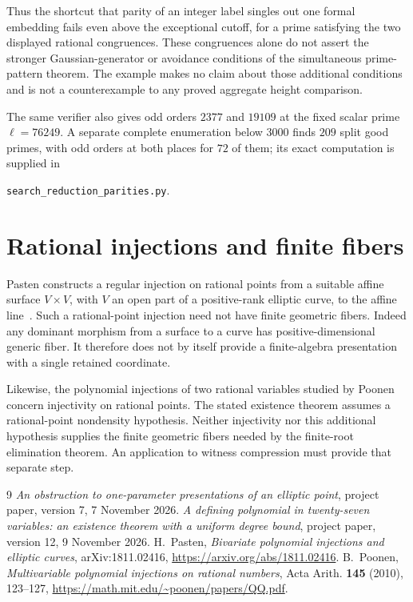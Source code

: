\documentclass[11pt,a4paper]{article}
\theoremstyle{remark}\newtheorem{remark}[theorem]{Remark}
\begin{document}
Thus the shortcut that parity of an integer label singles out one
formal embedding fails even above the exceptional cutoff, for a
prime satisfying the two displayed rational congruences.  These
congruences alone do not assert the stronger Gaussian-generator
or avoidance conditions of the simultaneous prime-pattern theorem.
The example makes no claim about those additional conditions and
is not a counterexample to any proved aggregate height comparison.

The same verifier also gives odd orders $2377$ and $19109$ at the
fixed scalar prime $\ell=76249$.  A separate complete enumeration
below $3000$ finds $209$ split good primes, with odd orders at both
places for $72$ of them; its exact computation is supplied in
\begin{center}\small
\nolinkurl{search_reduction_parities.py}.
\end{center}

\section{Rational injections and finite fibers}

Pasten constructs a regular injection on rational points from
a suitable affine surface $V\times V$, with $V$ an open part
of a positive-rank elliptic curve, to the affine line~\cite{Pasten}.
Such a rational-point injection need not have finite geometric
fibers.  Indeed any dominant morphism from a surface to a curve
has positive-dimensional generic fiber.  It therefore does not
by itself provide a finite-algebra presentation with a single
retained coordinate.

Likewise, the polynomial injections of two rational variables
studied by Poonen~\cite{Poonen} concern injectivity on rational
points.  The stated existence theorem assumes a rational-point
nondensity hypothesis.  Neither injectivity nor this additional
hypothesis supplies the finite geometric fibers needed by the
finite-root elimination theorem.  An application to witness
compression must provide that separate step.

\begin{thebibliography}{9}
\emph{An obstruction to one-parameter presentations of an elliptic point},
project paper, version 7, 7 November 2026.
\emph{A defining polynomial in twenty-seven variables:
an existence theorem with a uniform degree bound},
project paper, version 12, 9 November 2026.
H.~Pasten, \emph{Bivariate polynomial injections and elliptic curves},
arXiv:1811.02416, \url{https://arxiv.org/abs/1811.02416}.
B.~Poonen, \emph{Multivariable polynomial injections on rational numbers},
Acta Arith. \textbf{145} (2010), 123--127,
\url{https://math.mit.edu/~poonen/papers/QQ.pdf}.
\end{thebibliography}
\end{document}
